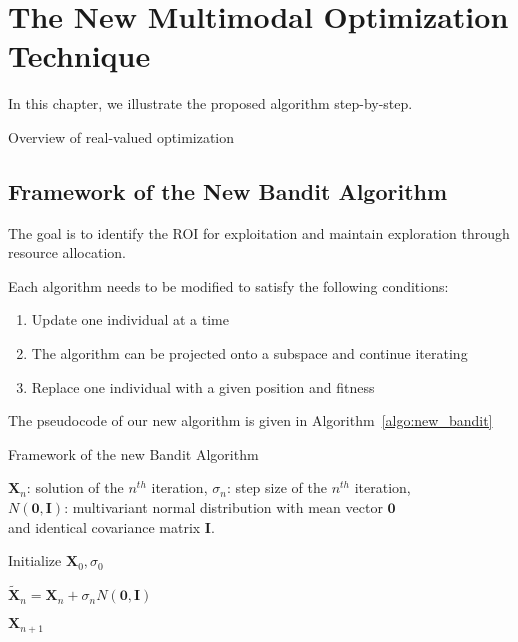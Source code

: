 \chapter{The New Multimodal Optimization Technique}
\label{chapter:new_bandit}

In this chapter, we illustrate the proposed algorithm step-by-step. 

Overview of real-valued optimization

\section{Framework of the New Bandit Algorithm}

The goal is to identify the ROI for exploitation and maintain exploration through resource allocation.

Each algorithm needs to be modified to satisfy the following conditions:
\begin{enumerate}
    \item Update one individual at a time 
    \item The algorithm can be projected onto a subspace and continue iterating
    \item Replace one individual with a given position and fitness
\end{enumerate}

The pseudocode of our new algorithm is given in Algorithm~\ref{algo:new_bandit}

\begin{algorithm}%
\caption{Framework of the new Bandit Algorithm}\label{algo:new_banidt}

$\boldsymbol{X}_{n}$: solution of the $n^{th}$ iteration, $\sigma_n$: step size of the $n^{th}$ iteration, \\
$N(\boldsymbol{0}, \boldsymbol{I})$: multivariant normal distribution with mean vector $\boldsymbol{0}$ \\ 
and identical covariance matrix $\boldsymbol{I}$.

\BlankLine
{} 

\BlankLine
Initialize $\boldsymbol{X}_0, \sigma_0$ \\
 {

    $\widetilde{\boldsymbol{X}}_n = \boldsymbol{X}_n + \sigma_n N(\boldsymbol{0}, \boldsymbol{I})$  \\

}

\Return $\boldsymbol{X}_{n+1}$

\end{algorithm}





